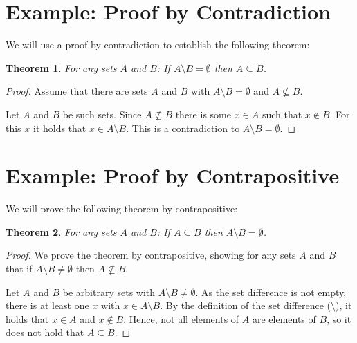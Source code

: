 \documentclass{article}
\newtheorem{theorem}{Theorem}
\begin{document}
\section{Example: Proof by Contradiction}
We will use a proof by contradiction to establish the following theorem:
\begin{theorem}
For any sets $A$ and $B$: If $A\setminus B = \emptyset$ then $A\subseteq B$.
\end{theorem}
\bigskip

\begin{proof}
Assume that there are sets $A$ and $B$ with $A\setminus B = \emptyset$ and
$A\not\subseteq B$.

Let $A$ and $B$ be such sets. Since $A\not\subseteq B$ there is some $x\in A$
such that $x\not\in B$. For this $x$ it holds that $x\in A\setminus B$. This is
a contradiction to $A\setminus B=\emptyset$.
\end{proof}
\pagebreak

\section{Example: Proof by Contrapositive}
We will prove the following theorem by contrapositive:

\begin{theorem}
For any sets $A$ and $B$: If $A\subseteq B$ then $A\setminus B = \emptyset$.
\end{theorem}
\bigskip


\begin{proof}
We prove the theorem by contrapositive, showing for any sets $A$ and $B$ that
if $A\setminus B\neq \emptyset$ then $A\not\subseteq B$.

Let $A$ and $B$ be arbitrary sets with $A\setminus B\neq \emptyset$. As the set
difference is not empty, there is at least one $x$ with $x\in A\setminus B$. By
the definition of the set difference ($\setminus$), it holds that $x\in A$ and
$x\notin B$. Hence, not all elements of $A$ are elements of $B$, so it does not
hold that $A\subseteq B$.
\end{proof}
\end{document}
